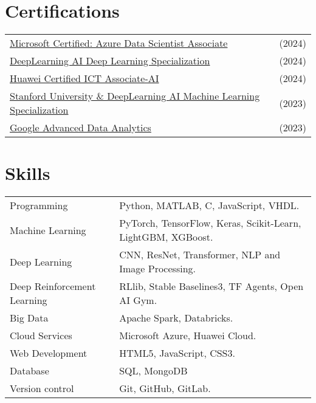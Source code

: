 \documentclass[a4paper,10pt]{article}
\begin{document}
\section{Certifications}
\begin{tabularx}{\linewidth}{@{}l X@{}}	
\href{https://balcortex.github.io/assets/certifications/microsoft_azure_data_scientist_associate.pdf}{Microsoft Certified: Azure Data Scientist Associate} & \hfill (2024) \\
\href{https://balcortex.github.io/assets/certifications/coursera_deep_learning.pdf}{DeepLearning AI Deep Learning Specialization} & \hfill (2024) \\
\href{https://balcortex.github.io/assets/certifications/huawei_certification.pdf}{Huawei Certified ICT Associate-AI} & \hfill (2024) \\
\href{https://balcortex.github.io/assets/certifications/coursera_machine_learning.pdf}{Stanford University \& DeepLearning AI Machine Learning Specialization} & \hfill (2023) \\
\href{https://balcortex.github.io/assets/certifications/coursera_google_advanced_data_analytics.pdf}{Google Advanced Data Analytics} & \hfill (2023) \\
\end{tabularx}

\section{Skills}
\begin{tabularx}{\linewidth}{@{}l X@{}}
Programming & Python, MATLAB, C, JavaScript, VHDL.\\
Machine Learning & PyTorch, TensorFlow, Keras, Scikit-Learn, LightGBM, XGBoost.\\
Deep Learning & CNN, ResNet, Transformer, NLP and Image Processing.\\
Deep Reinforcement Learning & RLlib, Stable Baselines3, TF Agents, Open AI Gym.\\
Big Data & Apache Spark, Databricks.\\
Cloud Services & Microsoft Azure, Huawei Cloud.\\
Web Development & HTML5, JavaScript, CSS3.\\
Database & SQL, MongoDB\\
Version control & Git, GitHub, GitLab.\\
\end{tabularx}
\end{document}
